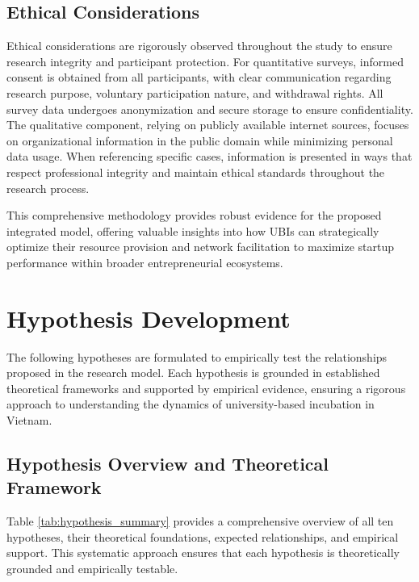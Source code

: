 \documentclass[../Main.tex]{subfiles}
\begin{document}
    \subsection{Ethical Considerations}
    Ethical considerations are rigorously observed throughout the study to ensure research integrity and participant protection. For quantitative surveys, informed consent is obtained from all participants, with clear communication regarding research purpose, voluntary participation nature, and withdrawal rights. All survey data undergoes anonymization and secure storage to ensure confidentiality. The qualitative component, relying on publicly available internet sources, focuses on organizational information in the public domain while minimizing personal data usage. When referencing specific cases, information is presented in ways that respect professional integrity and maintain ethical standards throughout the research process.

    This comprehensive methodology provides robust evidence for the proposed integrated model, offering valuable insights into how UBIs can strategically optimize their resource provision and network facilitation to maximize startup performance within broader entrepreneurial ecosystems.

    \section{Hypothesis Development}
    The following hypotheses are formulated to empirically test the relationships proposed in the research model. Each hypothesis is grounded in established theoretical frameworks and supported by empirical evidence, ensuring a rigorous approach to understanding the dynamics of university-based incubation in Vietnam.

    \subsection{Hypothesis Overview and Theoretical Framework}
    Table \ref{tab:hypothesis_summary} provides a comprehensive overview of all ten hypotheses, their theoretical foundations, expected relationships, and empirical support. This systematic approach ensures that each hypothesis is theoretically grounded and empirically testable.
\end{document}
